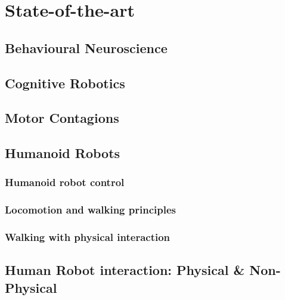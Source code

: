 \documentclass[a4paper, 12pt, oneside]{Thesis}  %
\begin{document}

\chapter{State-of-the-art}




\section{Behavioural Neuroscience}

\clearpage
\section{Cognitive Robotics}

\clearpage
\section{Motor Contagions}

\clearpage
\section{Humanoid Robots}
\subsection{Humanoid robot control}
\subsection{Locomotion and walking principles}
\subsection{Walking with physical interaction}

\clearpage
\section{Human Robot interaction: Physical \& Non-Physical}

\end{document}
